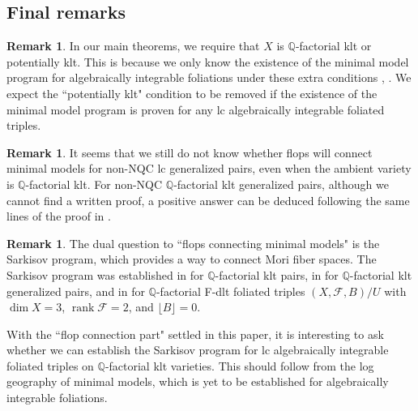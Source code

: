 \documentclass[11pt]{amsart}
\numberwithin{equation}{section}
\newcommand{\Qq}{\mathbb{Q}}
\newcommand{\rk}{\operatorname{rank}}
\newcommand{\Ff}{\mathcal{F}}
\theoremstyle{definition}
\theoremstyle{definition}
\newtheorem{rem}[thm]{Remark}
\theoremstyle{definition}
\begin{document}
\subsection{Final remarks}
\begin{rem} In our main theorems, we require that $X$ is $\Qq$-factorial klt or potentially klt. This is because we only know the existence of the minimal model program for algebraically integrable foliations under these extra conditions \cite[Theorems 1.2, 1.3]{LMX24b}, \cite[Theorem 1.11]{CHLMSSX24}. We expect the ``potentially klt" condition to be removed if the existence of the minimal model program is proven for any lc algebraically integrable foliated triples. \end{rem}

\begin{rem} It seems that we still do not know whether flops will connect minimal models for non-NQC lc generalized pairs, even when the ambient variety is $\Qq$-factorial klt. For non-NQC $\Qq$-factorial klt generalized pairs, although we cannot find a written proof, a positive answer can be deduced following the same lines of the proof in \cite[Proof of Theorem 1]{Kaw08}. \end{rem}

\begin{rem} The dual question to ``flops connecting minimal models" is the Sarkisov program, which provides a way to connect Mori fiber spaces. The Sarkisov program was established in \cite[Theorem 1.3]{HM13} for $\Qq$-factorial klt pairs, in \cite[Theorem 1.5]{Liu21} for $\Qq$-factorial klt generalized pairs, and in \cite[Theorem 1.1]{Mas24} for $\Qq$-factorial F-dlt foliated triples $(X,\Ff,B)/U$ with $\dim X=3$, $\rk\Ff=2$, and $\lfloor B\rfloor=0$.

With the ``flop connection part" settled in this paper, it is interesting to ask whether we can establish the Sarkisov program for lc algebraically integrable foliated triples on $\Qq$-factorial klt varieties. This should follow from the log geography of minimal models, which is yet to be established for algebraically integrable foliations. \end{rem}
\end{document}
